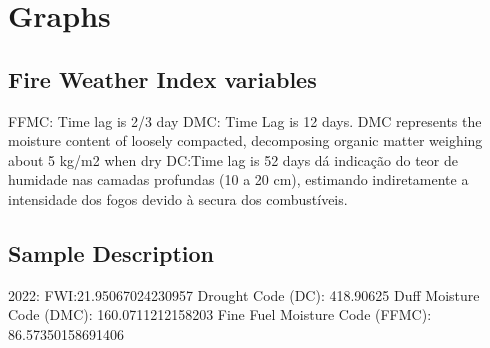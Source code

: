 \chapter{Graphs}
\label{sec:graphs}


\section{Fire Weather Index variables}
FFMC: Time lag is 2/3 day
DMC: Time Lag is 12 days. DMC represents the moisture content of loosely compacted, decomposing organic matter weighing about 5 kg/m2 when dry \cite{wikifire}
DC:Time lag is 52 days \cite{AICC} dá indicação do teor de humidade nas camadas
profundas (10 a 20 cm), estimando indiretamente a intensidade dos fogos devido à secura dos
combustíveis.

\section{Sample Description}
2022:
FWI:21.95067024230957
Drought Code (DC):  418.90625
Duff Moisture Code (DMC):  160.0711212158203
Fine Fuel Moisture Code (FFMC):  86.57350158691406

